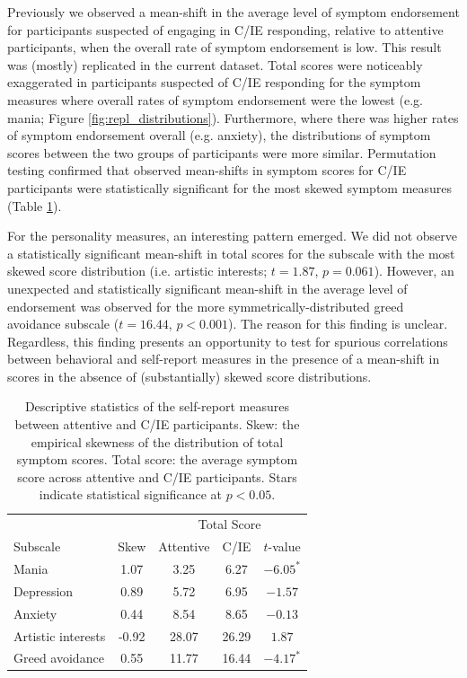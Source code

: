 \documentclass[a4paper,notitlepage,12pt]{article}
\begin{document}
\begin{refsection}[supp]
Previously we observed a mean-shift in the average level of symptom endorsement for participants suspected of engaging in C/IE responding, relative to attentive participants, when the overall rate of symptom endorsement is low. This result was (mostly) replicated in the current dataset. Total scores were noticeably exaggerated in participants suspected of C/IE responding for the symptom measures where overall rates of symptom endorsement were the lowest (e.g. mania; Figure \ref{fig:repl_distributions}). Furthermore, where there was higher rates of symptom endorsement overall (e.g. anxiety), the distributions of symptom scores between the two groups of participants were more similar. Permutation testing confirmed that observed mean-shifts in symptom scores for C/IE participants were statistically significant for the most skewed symptom measures (Table \ref{tab:rep_validation}).

For the personality measures, an interesting pattern emerged. We did not observe a statistically significant mean-shift in total scores for the subscale with the most skewed score distribution (i.e. artistic interests; $t = 1.87$, $p = 0.061$). However, an unexpected and statistically significant mean-shift in the average level of endorsement was observed for the more symmetrically-distributed greed avoidance subscale ($t = 16.44$, $p < 0.001$). The reason for this finding is unclear. Regardless, this finding presents an opportunity to test for spurious correlations between behavioral and self-report measures in the presence of a mean-shift in scores in the absence of (substantially) skewed score distributions. 

\begin{table}[!t]
\centering
\small
\begin{tabular}{lcccc}
\toprule
& & \multicolumn{3}{c}{Total Score} \\
\cmidrule(lr){3-5}
Subscale & Skew &  Attentive & C/IE & $t$-value \\
\midrule
Mania      &  1.07 &   3.25 &   6.27 & $-6.05^*$ \\
Depression &  0.89 &   5.72 &   6.95 & $-1.57$   \\
Anxiety    &  0.44 &   8.54 &   8.65 & $-0.13$   \\
Artistic interests   & -0.92 &  28.07 &  26.29 & $1.87$    \\
Greed avoidance     &  0.55 &  11.77 &  16.44 & $-4.17^*$  \\
\bottomrule
\end{tabular}
\captionsetup{width=0.88\textwidth}
\caption{Descriptive statistics of the self-report measures between attentive and C/IE participants. Skew: the empirical skewness of the distribution of total symptom scores. Total score: the average symptom score across attentive and C/IE participants. Stars indicate statistical significance at $p<0.05$.}
\label{tab:rep_validation}
\end{table}


\end{refsection}
\end{document}
